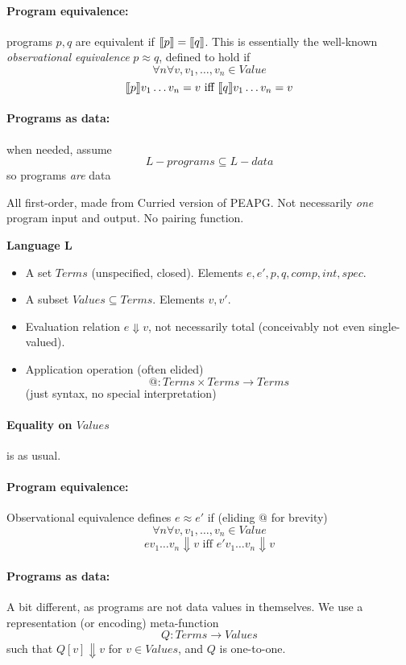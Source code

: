\documentclass[11pt,fleqn]{article}
\newcommand{\lsem}{\mbox{$\lbrack\hspace{-0.3ex}\lbrack$}}
\newcommand{\rsem}{\mbox{$\rbrack\hspace{-0.3ex}\rbrack$}}
\newcommand{\bc}{\begin{center}}
\newcommand{\ec}{\end{center}}
\newcommand{\bi}{\begin{itemize}}
\newcommand{\ei}{\end{itemize}}
\newcommand{\val}{\mathit{Value}}
\newcommand{\pg}[1]{\paragraph{#1}}
\begin{document}
\pg{Program equivalence:} programs $p,q$ are equivalent if $\lsem p\rsem = \lsem q\rsem$. 
This is essentially the well-known {\em observational  equivalence} $p \approx q$, defined to hold if 
$$
\forall n\forall v, v_1,\ldots,v_n \in \val$$
$$ 
\lsem p\rsem v_1\ldots v_n = v
\mbox{\ iff\ }
\lsem q\rsem v_1\ldots v_n = v 
$$


\pg{Programs as data:} when needed, assume $$L-programs \subseteq L-data$$
so programs {\em are} data




\newpage




\bc{}
\ec

All first-order, made from Curried version of PEAPG. Not necessarily {\em one} program input and output.
No pairing function.

\medskip

{\bf Language L} 
\bi
\item A set $\mathit{Terms}$ (unspecified, closed). Elements  $e, e', p, q, comp, int, spec$.\item A subset $\mathit{Values} \subseteq \mathit{Terms}$. Elements  $v, v'$.
\item Evaluation relation $e \Downarrow v$, not necessarily total (conceivably not even single-valued).
\item Application operation (often elided)
$$@:\mathit{Terms} \times \mathit{Terms} \to \mathit{Terms}$$
(just syntax, no special interpretation)

\ei

\vspace{25mm}


\pg{Equality on $\mathit{Values} $}  is as usual.

\pg{Program equivalence:} Observational equivalence defines
$e \approx e'$ if (eliding $@$ for brevity)
$$
\forall n\forall v, v_1,\ldots,v_n \in \val$$
$$ 
e v_1\ldots v_n \Downarrow v 
\mbox{\ iff\ }
e' v_1\ldots v_n \Downarrow v 
$$



\pg{Programs as data:} A bit different, as programs are not data values in themselves. We use a representation (or encoding) meta-function
$$
Q : \mathit{Terms} \to \mathit{Values}
$$
such that $Q[v]\Downarrow v$ for $v \in\mathit{Values}$, and $Q$ is one-to-one.
\end{document}
